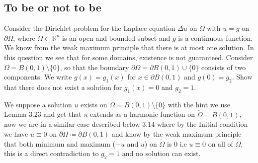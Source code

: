 \subsection*{To be or not to be}
\begin{question}
  Consider the Dirichlet problem for the Laplace equation $\Delta u$ on $\Omega $ with $u = g$ on $\partial \Omega $, where
$\Omega \subset  \mathbb{R}^{n} $ is an open and bounded subset and $g$ is a continuous function. We know from the weak
maximum principle that there is at most one solution. In this question we see that for some domains, existence is not guaranteed.
Consider $\Omega  = B(0,1) \setminus \{0\}  $, so that the boundary $\partial \Omega  = \partial B(0,1) \cup \{0\}  $ consists of two components.
We write $g(x) = g_1(x)$ for $x \in  \partial B(0,1)$ and $g(0) = g_2$. Show that there does not exist a solution
for $g_1(x) = 0$ and $g_2 = 1$.
\end{question}
\begin{solution}
  We suppose a solution $u$ exists on $\Omega  = B(0,1) \setminus \{0\} $ with the hint we use Lemma 3.23 and get that $u$ extends as a harmonic function
  on $\tilde{\Omega } = B(0,1) $, now we are in a similar case described below  3.14 where by the Initial condition we have $u \equiv 0 $ on $\partial \tilde{\Omega } \coloneqq  \partial B(0,1)  $
  and know by the weak maximum principle that both minimum and maximum ($-u$ and $u$) on $\tilde{\Omega } $ is 0 i.e $u \equiv 0$ on all of $\tilde{\Omega } $, this is a direct contradiction to $g_{2}=1$ 
  and no solution can exist.
\end{solution}
